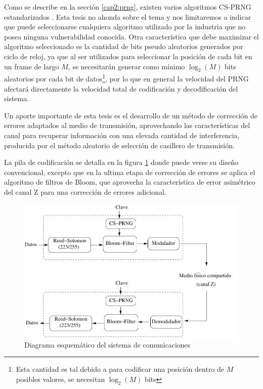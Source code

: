 Como se describe en la sección \ref{cap2:prng}, existen varios algoritmos CS-PRNG estandarizados \cite{gallagherfips}. Esta tesis no ahonda sobre el tema y nos limitaremos a indicar que puede seleccionarse cualquiera algoritmo utilizado por la industria que no posea ninguna vulnerabilidad conocida. Otra característica que debe maximizar el algoritmo seleccionado es la cantidad de bits pseudo aleatorios generados por ciclo de reloj, ya que al ser utilizados para seleccionar la posición de cada bit en un frame de largo $M$, se necesitarán generar como mínimo $\log_2(M)$ bits aleatorios por cada bit de datos\footnote{Esta cantidad es tal debido a para codificar una posición dentro de $M$ posibles valores, se necesitan $\log_2(M)$ bits}, por lo que en general la velocidad del PRNG afectará directamente la velocidad total de codificación y decodificación del sistema.

Un aporte importante de esta tesis es el desarrollo de un método de corrección de errores adaptados al medio de transmisión, aprovechando las características del canal para recuperar información con una elevada cantidad de interferencia, producida por el método aleatorio de selección de casillero de transmisión.

La pila de codificación se detalla en la figura \ref{fig_comstack} donde puede verse su diseño convencional, excepto que en la ultima etapa de corrección de errores se aplica el algoritmo de filtros de Bloom, que aprovecha la característica de error asimétrico del canal Z para una corrección de errores adicional.

\begin{figure}[t]
\centering
\includegraphics[width=4.5in]{graphs/Soft-stack3}
\caption{Diagrama esquemático del sistema de comunicaciones}
\label{fig_comstack}
\end{figure}

